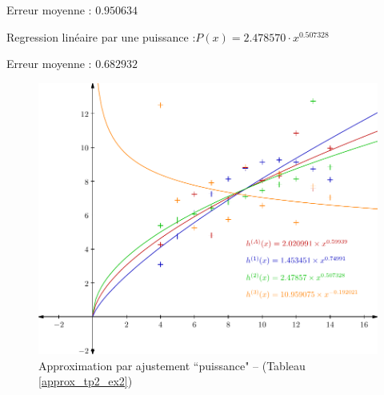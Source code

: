 \documentclass{report}
\begin{document}
        Erreur moyenne : $0.950634$

        Regression linéaire par une puissance :$P(x) = 2.478570 \cdot x^{0.507328}$
        
        Erreur moyenne : $0.682932$
	\begin{figure}[h]
	  \centering
	  \includegraphics{graphiques/pdf_output/reglin_tp2_ex2_3.pdf}
	  \caption{Approximation par ajustement ``puissance" -- (Tableau \ref{approx_tp2_ex2})}
	\end{figure}
      \newpage
\end{document}
